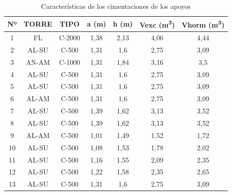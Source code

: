 \begin{table}[htbp]
\caption{Características de los cimentaciones de los apoyos} 
\centering
\label{tab:cimentaciones}
\begin{tabular}{|c|c|c|c|c|c|c|}
\hline
\rowcolor[HTML]{EFEFEF} 
\textbf{Nº} & \textbf{TORRE} & \textbf{TIPO} & \textbf{a (\si{\meter})} & \textbf{h (\si{\meter})} & \textbf{Vexc (\si{\cubic\meter})} & \textbf{Vhorm (\si{\cubic\meter})} \\ \hline
1           & FL             & C-2000        & 1,38           & 2,13           & 4,06               & 4,44                \\ \hline
2           & AL-SU          & C-500         & 1,31           & 1,6            & 2,75               & 3,09                \\ \hline
3           & AN-AM          & C-1000        & 1,31           & 1,84           & 3,16               & 3,5                 \\ \hline
4           & AL-SU          & C-500         & 1,31           & 1,6            & 2,75               & 3,09                \\ \hline
5           & AL-SU          & C-500         & 1,31           & 1,6            & 2,75               & 3,09                \\ \hline
6           & AL-AM          & C-500         & 1,31           & 1,6            & 2,75               & 3,09                \\ \hline
7           & AL-SU          & C-500         & 1,39           & 1,62           & 3,13               & 3,52                \\ \hline
8           & AL-SU          & C-500         & 1,39           & 1,62           & 3,13               & 3,52                \\ \hline
9           & AL-AM          & C-500         & 1,01           & 1,49           & 1,52               & 1,72                \\ \hline
10          & AL-SU          & C-500         & 1,08           & 1,53           & 1,78               & 2,02                \\ \hline
11          & AL-SU          & C-500         & 1,16           & 1,55           & 2,09               & 2,35                \\ \hline
12          & AL-SU          & C-500         & 1,22           & 1,58           & 2,35               & 2,65                \\ \hline
13          & AL-SU          & C-500         & 1,31           & 1,6            & 2,75               & 3,09                \\ \hline

\end{tabular}
\end{table}
